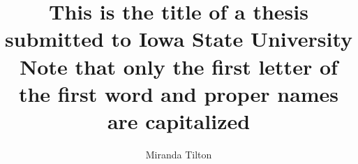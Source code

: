 \@makechapterheada\titlepage

\title{This is the title of a thesis
submitted to Iowa State University\\
Note that only the first letter of
the first word and proper names
are capitalized}
\author{Miranda Tilton}


\notice


\maketitle
